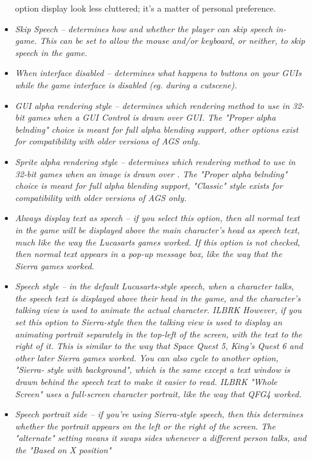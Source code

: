 \begin{itemize}
option display look less cluttered; it's a matter of personal preference.
\item \it{Skip Speech} -- determines how and whether the player can skip speech
in-game. This can be set to allow the mouse and/or keyboard, or neither, to
skip speech in the game.
\item \it{When interface disabled} -- determines what happens to buttons on your
GUIs while the game interface is disabled (eg. during a cutscene).
\item \it{GUI alpha rendering style} -- determines which rendering method to use in
32-bit games when a GUI Control is drawn over GUI. The "Proper alpha belnding"
choice is meant for full alpha blending support, other options exist for
compatibility with older versions of AGS only.
\item \it{Sprite alpha rendering style} -- determines which rendering method to use
in 32-bit games when an image is drawn over .
The "Proper alpha belnding" choice is meant for full alpha blending support,
"Classic" style exists for  compatibility with older versions of AGS only.
\item \it{Always display text as speech} -- if you select this option, then all normal
text in the game will be displayed above the main character's head as speech
text, much like the way the Lucasarts games worked. If this option is not
checked, then normal text appears in a pop-up message box, like the way that
the Sierra games worked.
\item \it{Speech style} -- in the default Lucasarts-style speech, when a character talks, the
speech text is displayed above their head in the game, and the character's
talking view is used to animate the actual character. ILBRK
However, if you set this option to Sierra-style then the talking view is used to display an
animating portrait separately in the top-left of the screen, with the text to the right of it.
This is similar to the way that Space Quest 5, King's Quest 6 and other
later Sierra games worked. You can also cycle to another option, "Sierra-
style with background", which is the same except a text window is drawn
behind the speech text to make it easier to read. ILBRK
"Whole Screen" uses a full-screen character portrait, like the way that QFG4 worked.
\item \it{Speech portrait side} -- if you're using Sierra-style speech, then this
determines whether the portrait appears on the left or the right of the screen. The "alternate"
setting means it swaps sides whenever a different person talks, and the "Based on X position"

\end{itemize}
